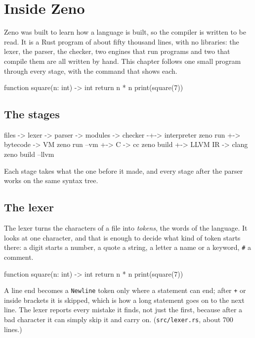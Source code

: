 \chapter{Inside Zeno}\label{ch-inside}

Zeno was built to learn how a language is built, so the compiler is
written to be read. It is a Rust program of about fifty thousand
lines, with no libraries: the lexer, the parser, the checker, two
engines that run programs and two that compile them are all written by
hand. This chapter follows one small program through every stage, with
the command that shows each.

\begin{zeno}[file=square.zeno, dir=sq]
function square(n: int) -> int {
    return n * n
}
print(square(7))
\end{zeno}

\section{The stages}

\begin{zenofrag}[lang=shell]
files -> lexer -> parser -> modules -> checker -+-> interpreter     zeno run
                                                +-> bytecode -> VM  zeno run --vm
                                                +-> C -> cc         zeno build
                                                +-> LLVM IR -> clang  zeno build --llvm
\end{zenofrag}

Each stage takes what the one before it made, and every stage after
the parser works on the same syntax tree.

\section{The lexer}

The lexer turns the characters of a file into \emph{tokens}, the words
of the language. It looks at one character, and that is enough to
decide what kind of token starts there: a digit starts a number, a
quote a string, a letter a name or a keyword, \verb|#| a comment.

\begin{zeno}[file=square.zeno, dir=sq, show=no, cmd=zeno tokens {file} | head -12]
function square(n: int) -> int {
    return n * n
}
print(square(7))
\end{zeno}

A line end becomes a \verb|Newline| token only where a statement can
end; after \verb|+| or inside brackets it is skipped, which is how a
long statement goes on to the next line. The lexer reports every
mistake it finds, not just the first, because after a bad character it
can simply skip it and carry on. (\verb|src/lexer.rs|, about 700 lines.)

